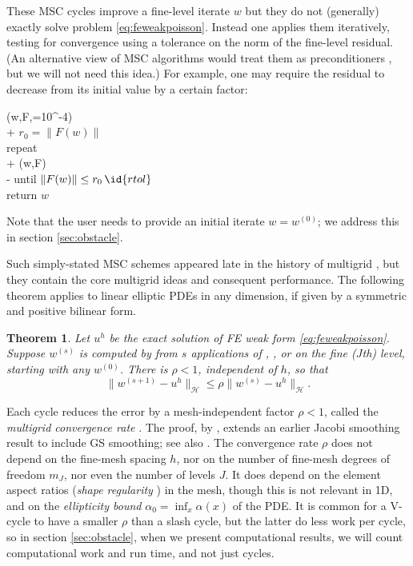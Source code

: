 \documentclass[letterpaper,final,12pt,reqno]{amsart}
\theoremstyle{claim}
\newtheorem{theorem}{Theorem}
\numberwithin{equation}{section}
\numberwithin{figure}{section}
\numberwithin{table}{section}
\numberwithin{theorem}{section}
\begin{document}
These MSC cycles improve a fine-level iterate $w$ but they do not (generally) exactly solve problem \eqref{eq:feweakpoisson}.  Instead one applies them iteratively, testing for convergence using a tolerance on the norm of the fine-level residual.  (An alternative view of MSC algorithms would treat them as preconditioners \cite[for example]{Bueler2021}, but we will not need this idea.)  For example, one may require the residual to decrease from its initial value by a certain factor:
\begin{pseudo*} \label{ps:msc-solver}
(w,F,=10^{-4})\text{:} \\+
    $r_0 = \|F(w)\|$ \\
    repeat \\+
        (w,F) \qquad\qquad {} \\-
    until $\|F(w)\| \le r_0\, \id{rtol}$ \\
    return $w$
\end{pseudo*}
Note that the user needs to provide an initial iterate $w=w^{(0)}$; we address this in section \ref{sec:obstacle}.

Such simply-stated MSC schemes appeared late in the history of multigrid \cite{Xu1992}, but they contain the core multigrid ideas and consequent performance.  The following theorem applies to linear elliptic PDEs in any dimension, if given by a symmetric and positive bilinear form.

\begin{theorem} \label{thm:mscconvergence}  Let $u^h$ be the exact solution of FE weak form \eqref{eq:feweakpoisson}.  Suppose $w^{(s)}$ is computed by from $s$ applications of , , or  on the fine ($J$th) level, starting with any $w^{(0)}$.  There is $\rho<1$, independent of $h$, so that
\begin{equation}
  \|w^{(s+1)} - u^h\|_{\mathcal{H}} \le \rho \|w^{(s)} - u^h\|_{\mathcal{H}}.  \label{eq:mscconvergence}
\end{equation}
\end{theorem}

Each cycle reduces the error by a mesh-independent factor $\rho<1$, called the \emph{multigrid convergence rate} \cite{Braess2007}.  The proof, by \cite{Neuss1998}, extends an earlier Jacobi smoothing result \cite{BraessHackbusch1983} to include GS smoothing; see also \cite[Thm.~3.10]{GraeserKornhuber2009}.  The convergence rate $\rho$ does not depend on the fine-mesh spacing $h$, nor on the number of fine-mesh degrees of freedom $m_J$, nor even the number of levels $J$.  It does depend on the element aspect ratios (\emph{shape regularity} \cite{Elmanetal2014}) in the mesh, though this is not relevant in 1D, and on the \emph{ellipticity bound} $\alpha_0=\inf_x \alpha(x)$ of the PDE.  It is common for a V-cycle to have a smaller $\rho$ than a slash cycle, but the latter do less work per cycle, so in section \ref{sec:obstacle}, when we present computational results, we will count computational work and run time, and not just cycles.
\end{document}
